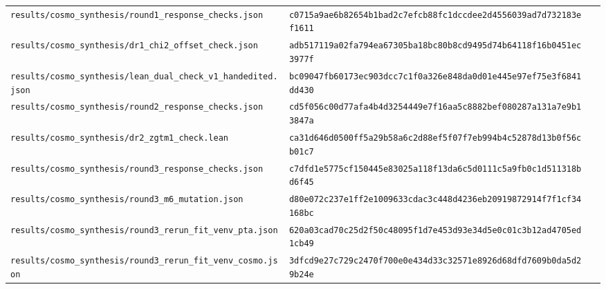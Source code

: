 \begin{tabular}{lll}
\scriptsize\texttt{results/cosmo\_synthesis/round1\_response\_checks.json} & \scriptsize\texttt{c0715a9ae6b82654b1bad2c7efcb88fc1dccdee2d4556039ad7d732183ef1611} &  \\
\scriptsize\texttt{results/cosmo\_synthesis/dr1\_chi2\_offset\_check.json} & \scriptsize\texttt{adb517119a02fa794ea67305ba18bc80b8cd9495d74b64118f16b0451ec3977f} &  \\
\scriptsize\texttt{results/cosmo\_synthesis/lean\_dual\_check\_v1\_handedited.json} & \scriptsize\texttt{bc09047fb60173ec903dcc7c1f0a326e848da0d01e445e97ef75e3f6841dd430} &  \\
\scriptsize\texttt{results/cosmo\_synthesis/round2\_response\_checks.json} & \scriptsize\texttt{cd5f056c00d77afa4b4d3254449e7f16aa5c8882bef080287a131a7e9b13847a} &  \\
\scriptsize\texttt{results/cosmo\_synthesis/dr2\_zgtm1\_check.lean} & \scriptsize\texttt{ca31d646d0500ff5a29b58a6c2d88ef5f07f7eb994b4c52878d13b0f56cb01c7} &  \\
\scriptsize\texttt{results/cosmo\_synthesis/round3\_response\_checks.json} & \scriptsize\texttt{c7dfd1e5775cf150445e83025a118f13da6c5d0111c5a9fb0c1d511318bd6f45} &  \\
\scriptsize\texttt{results/cosmo\_synthesis/round3\_m6\_mutation.json} & \scriptsize\texttt{d80e072c237e1ff2e1009633cdac3c448d4236eb20919872914f7f1cf34168bc} &  \\
\scriptsize\texttt{results/cosmo\_synthesis/round3\_rerun\_fit\_venv\_pta.json} & \scriptsize\texttt{620a03cad70c25d2f50c48095f1d7e453d93e34d5e0c01c3b12ad4705ed1cb49} &  \\
\scriptsize\texttt{results/cosmo\_synthesis/round3\_rerun\_fit\_venv\_cosmo.json} & \scriptsize\texttt{3dfcd9e27c729c2470f700e0e434d33c32571e8926d68dfd7609b0da5d29b24e} &  \\
\bottomrule
\end{tabular}
